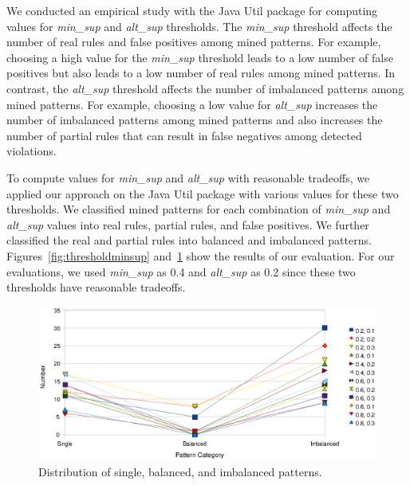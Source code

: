We conducted an empirical study with the Java Util package for computing values for \emph{min\_sup} and \emph{alt\_sup} thresholds. The \emph{min\_sup} threshold affects the number of real rules and false positives among mined patterns. For example, choosing a high value for the \emph{min\_sup} threshold leads to a low number of false positives but also leads to a low number of real rules among mined patterns. In contrast, the \emph{alt\_sup} threshold affects the number of imbalanced patterns among mined patterns. For example, choosing a low value for \emph{alt\_sup} increases the number of imbalanced patterns among mined patterns and also increases the number of partial rules that can result in false negatives among detected violations.

To compute values for \emph{min\_sup} and \emph{alt\_sup} with reasonable tradeoffs, we applied our approach on the Java Util package with various values for these two thresholds. We classified mined patterns for each combination of \emph{min\_sup} and \emph{alt\_sup} values into real rules, partial rules, and false positives. We further classified the real and partial rules into balanced and imbalanced patterns. Figures~\ref{fig:thresholdminsup} and~\ref{fig:thresholdaltsup} show the results of our evaluation. For our evaluations, we used \emph{min\_sup} as 0.4 and \emph{alt\_sup} as 0.2 since these two thresholds have reasonable tradeoffs.

\begin{figure}[t]
\centering
\includegraphics[scale=0.80,clip]{figs/Threshold_subcategories.eps}
\caption{Distribution of single, balanced, and imbalanced patterns.} \label{fig:thresholdaltsup}
\end{figure}